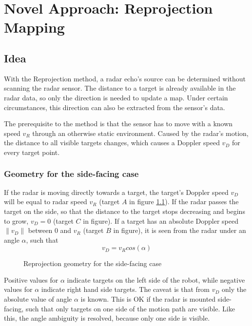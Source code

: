 
\chapter{Novel Approach: Reprojection
Mapping}\label{novel-approach-reprojection-mapping}

\section{Idea}\label{idea}

With the Reprojection method, a radar echo's source can be determined
without scanning the radar sensor. The distance to a target is already
available in the radar data, so only the direction is needed to update a
map. Under certain circumstances, this direction can also be extracted
from the sensor's data.

The prerequisite to the method is that the sensor has to move with a
known speed \(v_R\) through an otherwise static environment. Caused by
the radar's motion, the distance to all visible targets changes, which
causes a Doppler speed \(v_D\) for every target point.

\subsection{Geometry for the side-facing
case}\label{geometry-for-the-side-facing-case}

If the radar is moving directly towards a target, the target's Doppler
speed \(v_D\) will be equal to radar speed \(v_R\) (target \(A\) in
figure \ref{fig:geometry_side}). If the radar passes the target on the side, so that the
distance to the target stops decreasing and begins to grow, \(v_D = 0\)
(target \(C\) in figure). If a target has an absolute Doppler speed
\(\|v_D\|\) between \(0\) and \(v_R\) (target \(B\) in figure), it is seen
from the radar under an angle \(\alpha\), such that
\[v_D = v_R cos(\alpha)\]

\begin{figure}[htp]
    \centering
    \label{fig:geometry_side}
    \def\svgwidth{\linewidth}
    
    \caption{Reprojection geometry for the side-facing case}
\end{figure}

Positive values for \(\alpha\) indicate targets on the left side of the
robot, while negative values for \(\alpha\) indicate right hand side
targets. The caveat is that from \(v_D\) only the absolute value of
angle \(\alpha\) is known. This is OK if the radar is mounted
side-facing, such that only targets on one side of the motion path are
visible. Like this, the angle ambiguity is resolved, because only one
side is visible.

